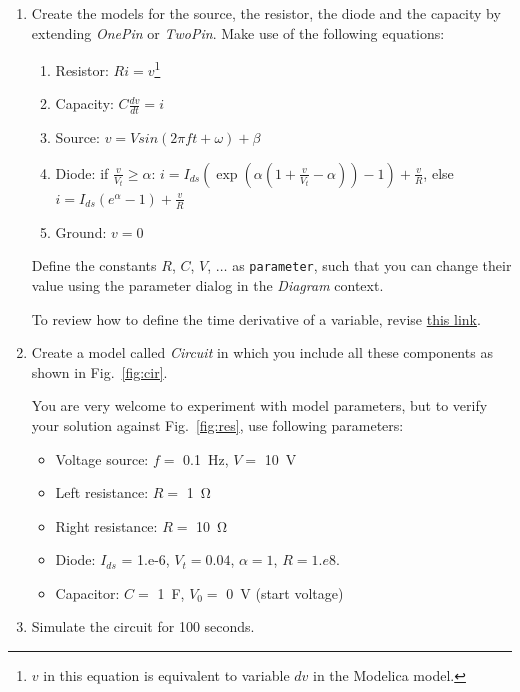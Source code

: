 \documentclass[10pt,a4paper]{article}
\begin{document}
\begin{enumerate}
	While still in \texttt{partial model} \textit{TwoPin}, add equations that link the variables in this model with the variables of the pins. When connecting currents, use the convention that when the current flows into the component from the pin, it is positive and vice versa.
	
	\item Create the models for the source, the resistor, the diode and the capacity by extending \textit{OnePin} or \textit{TwoPin}. Make use of the following equations:
	\begin{enumerate}
		\item Resistor: $R i = v$\footnote{$v$ in this equation is equivalent to variable $dv$ in the Modelica model.}
		\item Capacity: $C \frac{d v}{dt} = i$
		\item Source: $v = V sin( 2 \pi f t + \omega) + \beta$
		\item Diode: if $ \frac{v}{V_t} \geq \alpha$: $i = I_{ds} \left( \exp\left(\alpha \left( 1 + \frac{v}{V_t} - \alpha \right)\right) - 1\right) + \frac{v}{R}$, else $i = I_{ds} (e^\alpha - 1) + \frac{v}{R}$
		\item Ground: $ v = 0$
	\end{enumerate}
	Define the constants $R$, $C$, $V$, $\ldots$  as \texttt{parameter}, such that you can change their value using the parameter dialog in the \textit{Diagram} context.
	
	To review how to define the time derivative of a variable, revise 
	\href{https://mbe.modelica.university/behavior/equations/first_order/}{this link}.
	\item Create a model called \textit{Circuit} in which you include all these components as shown in Fig.~\ref{fig:cir}. 
	
	You are very welcome to experiment with model parameters, but to verify your solution against Fig.~\ref{fig:res}, use following parameters:
	\begin{itemize}
		\item Voltage source: $f =$ \SI{0.1}{\hertz}, $V =$ \SI{10}{\volt}
		\item Left resistance: $R =$ \SI{1}{\ohm}
		\item Right resistance: $R =$ \SI{10}{\ohm}
		\item Diode: $I_{ds}$ = 1.e-6, $V_t=0.04$, $\alpha=1$, $R=1.e8$.
		\item Capacitor: $C =$ \SI{1}{\farad}, $V_0 =$ \SI{0}{\volt} (start voltage)
	\end{itemize}
	\item Simulate the circuit for 100 seconds.
\end{enumerate}
\end{document}
